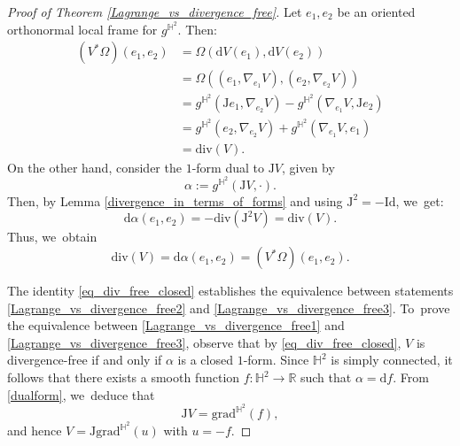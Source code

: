 \documentclass[10pt]{amsart}
\theoremstyle{plain}
\theoremstyle{definition}
\begin{document}
\begin{proof}[Proof of Theorem \ref{Lagrange_vs_divergence_free}]
Let \(e_1, e_2 \) be an oriented orthonormal local frame for \(g^{\mathbb{H}^2} \). Then:
\begin{align*}
(V^*\Omega)(e_1, e_2)
&= \Omega(\mathrm{d}V(e_1), \mathrm{d}V(e_2)) \\
&= \Omega((e_1, \nabla_{e_1}V), (e_2, \nabla_{e_2}V)) \\
&= g^{\mathbb{H}^2}(\mathrm{J}e_1, \nabla_{e_2}V) - g^{\mathbb{H}^{2}}(\nabla_{e_1}V, \mathrm{J}e_2) \\
&= g^{\mathbb{H}^2}(e_2, \nabla_{e_2}V) + g^{\mathbb{H}^{2}}(\nabla_{e_1}V, e_1) \\
&= \mathrm{div}(V).
\end{align*}
On the other hand, consider the $1$-form dual to \(\mathrm{J}V \), given by
\begin{equation}\label{dualform}
\alpha := g^{\mathbb{H}^2}(\mathrm{J}V, \cdot).
\end{equation}
Then, by Lemma \ref{divergence_in_terms_of_forms} and using \(\mathrm{J}^2 = -\mathrm{Id} \), we~get:
\[
\mathrm{d}\alpha(e_1, e_2) = -\mathrm{div}(\mathrm{J}^2 V) = \mathrm{div}(V).
\]
Thus, we~obtain
\begin{equation}\label{eq_div_free_closed}
\mathrm{div}(V) = \mathrm{d}\alpha(e_1, e_2) = (V^*\Omega)(e_1, e_2).
\end{equation}

The identity \eqref{eq_div_free_closed} establishes the equivalence between statements \eqref{Lagrange_vs_divergence_free2} and \eqref{Lagrange_vs_divergence_free3}. To~prove the equivalence between \eqref{Lagrange_vs_divergence_free1} and \eqref{Lagrange_vs_divergence_free3}, observe that by \eqref{eq_div_free_closed}, \(V \) is divergence-free if and only if \(\alpha \) is a closed $1$-form. Since \(\mathbb{H}^2 \) is simply connected, it follows that there exists a smooth function \(f: \mathbb{H}^2 \to \mathbb{R} \) such that \(\alpha = \mathrm{d}f \). From \eqref{dualform}, we~deduce that
\[
\mathrm{J}V = \mathrm{grad}^{\mathbb{H}^2}(f),
\]
and hence \(V = \mathrm{J} \mathrm{grad}^{\mathbb{H}^2} (u) \) with \(u = -f \).
\end{proof}
\end{document}
